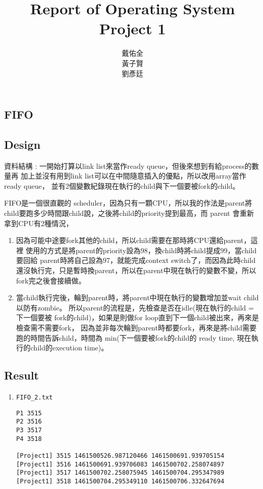 \documentclass{article}
\title{Report of Operating System Project 1}
\author{戴佑全\\黃子賢\\劉彥廷}
\begin{document}
\begin{CJK}{UTF8}{bkai}
\maketitle

\section{FIFO}
\subsection{Design}

資料結構 : 一開始打算以link list來當作ready queue，但後來想到有給process的數量再
加上並沒有用到link list可以在中間隨意插入的優點，所以改用array當作ready queue，
並有2個變數紀錄現在執行的child與下一個要被fork的child。

FIFO是一個很直觀的 scheduler，因為只有一顆CPU，所以我的作法是parent將
child要跑多少時間跟child說，之後將child的priority提到最高，而 parent
會重新拿到CPU有2種情況，

\begin{enumerate}
  \item 因為可能中途要fork其他的child，所以child需要在那時將CPU還給parent，這裡 使用的方式是將parent的priority設為98，換child時將child提成99，當child要回給 parent時將自己設為97，就能完成context switch了，而因為此時child還沒執行完，只是暫時換parent，所以在parent中現在執行的變數不變，所以fork完之後會接續做。
  \item 當child執行完後，輪到parent時，將parent中現在執行的變數增加並wait child 以防有zombie。 所以parent的流程是，先檢查是否在idle(現在執行的child = 下一個要被 fork的child)，如果是則做for loop直到下一個child被出來，再來是檢查需不需要fork， 因為並非每次輪到parent時都要fork，再來是將child需要跑的時間告訴child，時間為 min(下一個要被fork的child的 ready time, 現在執行的child的execution time)。
\end{enumerate}

\subsection{Result}

\begin{enumerate}
\item \texttt{FIFO\_2.txt}
\begin{verbatim}
P1 3515
P2 3516
P3 3517
P4 3518

[Project1] 3515 1461500526.987120466 1461500691.939705154
[Project1] 3516 1461500691.939706083 1461500702.258074897
[Project1] 3517 1461500702.258075945 1461500704.295347989
[Project1] 3518 1461500704.295349110 1461500706.332647694
\end{verbatim}
\end{enumerate}


\end{CJK}
\end{document}
